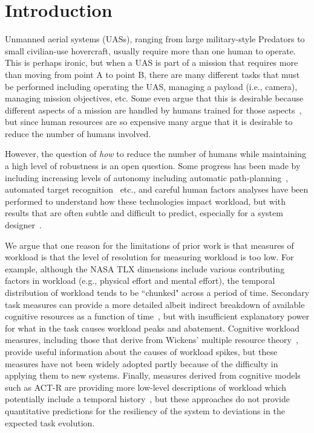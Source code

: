 \section{Introduction}

Unmanned aerial systems (UASs), ranging from large military-style Predators to small civilian-use hovercraft, usually require more than one human to operate.  This is perhaps ironic, but when a UAS is part of a mission that requires more than moving from point A to point B, there are many different tasks that must be performed including operating the UAS, managing a payload (i.e., camera), managing mission objectives, etc.  Some even argue that this is desirable because different aspects of a mission are handled by humans trained for those aspects~\cite{MurphyBurke2010}, but since human resources are so expensive many argue that it is desirable to reduce the number of humans involved.

However, the question of {\em how} to reduce the number of humans while maintaining a high level of robustness is an open question.  Some progress has been made by including increasing levels of autonomy including automatic path-planning~\cite{WongBourgaultFurukawa2005,878915,pettersson2006probabilistic,QuigleyBarberEtAl2005,NelsonBarberMcLainBeard2006}, automated target recognition~\cite{MorseEnghGoodrich2010,dasgupta2008multiagent,barber2006vision} etc., and careful human factors analyses have been performed to understand how these technologies impact workload, but with results that are often subtle and difficult to predict, especially for a system designer~\cite{KaberEndsley2004,chen2011supervisory,chen2007human}.

We argue that one reason for the limitations of prior work is that measures of workload is that the level of resolution for measuring workload is too low.  For example, although the NASA TLX dimensions include various contributing factors in workload (e.g., physical effort and mental effort), the temporal distribution of workload tends to be ``chunked" across a period of time.  Secondary task measures can provide a more detailed albeit indirect breakdown of available cognitive resources as a function of time~\cite{kaber1999adaptive}, but with insufficient explanatory power for what in the task causes workload peaks and abatement.  Cognitive workload measures, including those that derive from Wickens' multiple resource theory~\cite{wickens2002multiple}, provide useful information about the causes of workload spikes, but these measures have not been widely adopted partly because of the difficulty in applying them to new systems.  Finally, measures derived from cognitive models such as ACT-R are providing more low-level descriptions of workload which potentially include a temporal history~\cite{lebiere2013cognitive}, but these approaches do not provide quantitative predictions for the resiliency of the system to deviations in the expected task evolution.

